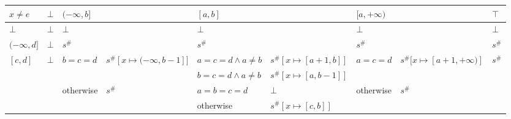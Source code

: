 \documentclass{article}
\begin{document}
\begin{table}[]
    \begin{tabular}{|l|l|ll|ll|ll|l|}
    \hline
    $x \ne e$                       & $\bot$                  & \multicolumn{2}{l|}{$(-\infty, b]$}                                                & \multicolumn{2}{l|}{$[a, b]$}                            & \multicolumn{2}{l|}{$[a, +\infty)$}                                                & $\top$                  \\ \hline
    $\bot$                          & $\bot$                  & \multicolumn{2}{l|}{$\bot$}                                                        & \multicolumn{2}{l|}{$\bot$}                              & \multicolumn{2}{l|}{$\bot$}                                                        & $\bot$                  \\ \hline
    $(-\infty, d]$                  & $\bot$                  & \multicolumn{2}{l|}{$s^\#$}                                                        & $s^\#$                    &                              & \multicolumn{2}{l|}{$s^\#$}                                                        & $s^\#$                  \\ \hline
    \multirow{4}{*}{$[c, d]$}       & \multirow{4}{*}{$\bot$} & \multirow{2}{*}{$b = c = d$} & \multirow{2}{*}{$s^\#[x \mapsto (-\infty, b - 1]]$} & $a = c = d \land a \ne b$ & $s^\#[x \mapsto [a + 1, b]]$ & \multirow{2}{*}{$a = c = d$} & \multirow{2}{*}{$s^\#[x \mapsto [a + 1, +\infty)]$} & \multirow{4}{*}{$s^\#$} \\
                                    &                         &                              &                                                     & $b = c = d \land a \ne b$ & $s^\#[x \mapsto [a, b - 1]]$ &                              &                                                     &                         \\
                                    &                         & \multirow{2}{*}{otherwise}   & \multirow{2}{*}{$s^\#$}                             & $a = b = c = d$           & $\bot$                       & \multirow{2}{*}{otherwise}   & \multirow{2}{*}{$s^\#$}                             &                         \\
                                    &                         &                              &                                                     & otherwise                 & $s^\#[x \mapsto [c, b]]$     &                              &                                                     &                         \\ \hline

\end{tabular}
\end{table}
\end{document}
